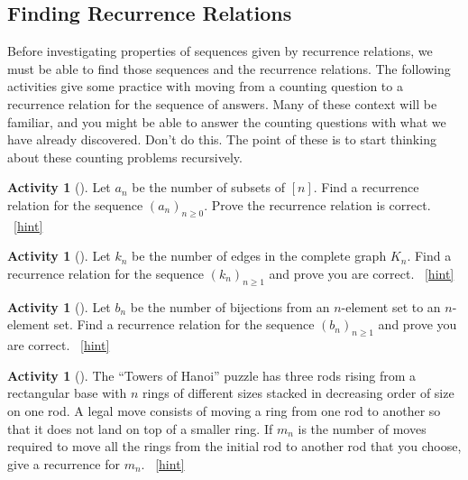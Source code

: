 \documentclass[10pt,]{book}
\theoremstyle{plain}
\theoremstyle{definition}
\theoremstyle{definition}
\theoremstyle{definition}
\newtheorem{activity}[project]{Activity}
\numberwithin{equation}{chapter}
\begin{document}
\subsection[{Finding Recurrence Relations}]{Finding Recurrence Relations}\label{subsec-recursionfinding}
\hypertarget{p-460}{}%
Before investigating properties of sequences given by recurrence relations, we must be able to find those sequences and the recurrence relations.  The following activities give some practice with moving from a counting question to a recurrence relation for the sequence of answers.  Many of these context will be familiar, and you might be able to answer the counting questions with what we have already discovered.  Don't do this.  The point of these is to start thinking about these counting problems recursively.%
\begin{activity}[]\label{activity-72}
\hypertarget{p-461}{}%
Let \(a_n\) be the number of subsets of \([n]\).  Find a recurrence relation for the sequence \((a_n)_{n \ge 0}\).  Prove the recurrence relation is correct.%
~\hfill{\tiny\hyperlink{a-72}{[hint]}\hypertarget{q-72}{}}\end{activity}
\begin{activity}[]\label{activity-73}
\hypertarget{p-463}{}%
Let \(k_n\) be the number of edges in the complete graph \(K_n\).  Find a recurrence relation for the sequence \((k_n)_{n \ge 1}\) and prove you are correct.%
~\hfill{\tiny\hyperlink{a-73}{[hint]}\hypertarget{q-73}{}}\end{activity}
\begin{activity}[]\label{activity-74}
\hypertarget{p-465}{}%
Let \(b_n\) be the number of bijections from an \(n\)-element set to an \(n\)-element set.  Find a recurrence relation for the sequence \((b_n)_{n \ge 1}\) and prove you are correct.%
~\hfill{\tiny\hyperlink{a-74}{[hint]}\hypertarget{q-74}{}}\end{activity}
\begin{activity}[]\label{HanoiProblem}
\hypertarget{p-467}{}%
The ``Towers of Hanoi'' puzzle has three rods rising from a rectangular base with \(n\) rings of different sizes stacked in decreasing order of size on one rod. A legal move consists of moving a ring from one rod to another so that it does not land on top of a smaller ring. If \(m_n\) is the number of moves required to move all the rings from the initial rod to another rod that you choose, give a recurrence for \(m_n\).%
~\hfill{\tiny\hyperlink{a-75}{[hint]}\hypertarget{q-75}{}}\end{activity}
\end{document}
